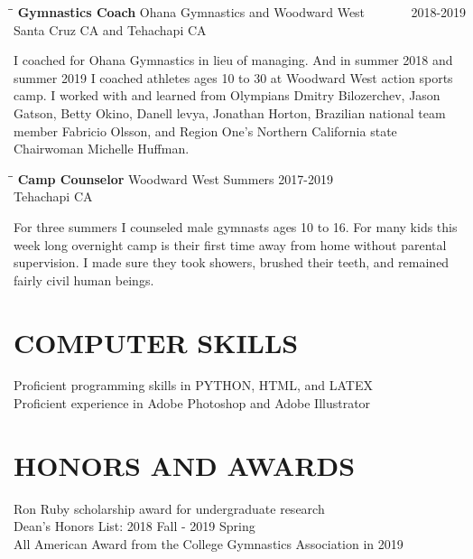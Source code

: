 \documentclass{res}
\begin{document}
\begin{resume}
   \begin{tabbing}%
   \hspace{2.3in}\= \hspace{2.6in}\= \kill %
   {\bf Gymnastics Coach}  \>Ohana Gymnastics and Woodward West \> ~~~~~~ 2018-2019\\
                          \>Santa Cruz CA and Tehachapi CA
   \end{tabbing}\vspace{-20pt}
    I coached for Ohana Gymnastics in lieu of managing. And in summer 2018 and summer 	2019 I coached athletes ages 10 to 30 at Woodward West action sports camp.  I worked with and learned from Olympians Dmitry Bilozerchev, Jason Gatson, Betty Okino, Danell levya, Jonathan Horton, Brazilian national team member Fabricio Olsson, and Region One's Northern California state Chairwoman Michelle Huffman.
    
   \begin{tabbing}%
   \hspace{2.3in}\= \hspace{2.6in}\= \kill %
   {\bf Camp Counselor}  \>Woodward West \> Summers 2017-2019\\
                          \>Tehachapi CA
   \end{tabbing}\vspace{-20pt}
    For three summers I counseled male gymnasts ages 10 to 16. For many kids this week long overnight camp is their first time away from home without parental supervision. I made sure they took showers, brushed their teeth, and remained fairly civil human beings.



\section{COMPUTER SKILLS}                  
    Proficient programming skills in PYTHON, HTML, and LATEX\\
    Proficient experience in Adobe Photoshop and Adobe Illustrator           
 
 
 
\section{HONORS AND AWARDS}        
	Ron Ruby scholarship award for undergraduate research\\
	Dean's Honors List: 2018 Fall - 2019 Spring\\
	All American Award from the College Gymnastics Association in 2019\\
	

\end{resume}
\end{document}
